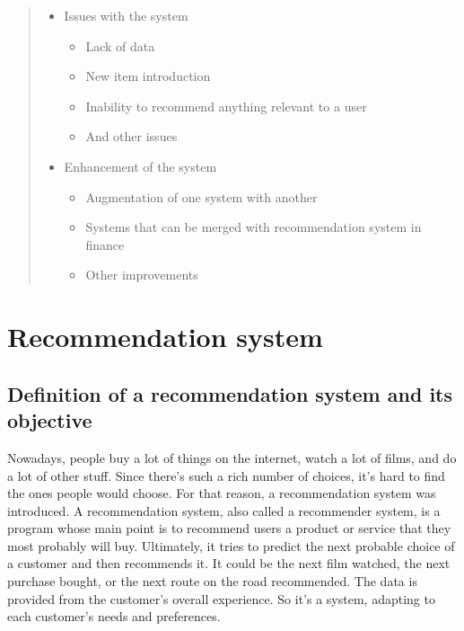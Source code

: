 \documentclass[10pt,twoside,english,a4paper]{article}
\begin{document}
\begin{abstract}
\begin{itemize}
    \item Issues with the system
    \begin{itemize}
        \item Lack of data
        \item New item introduction
        \item Inability to recommend anything relevant to a user
        \item And other issues
    \end{itemize}
    
    \item Enhancement of the system
    \begin{itemize}
        \item Augmentation of one system with another
        \item Systems that can be merged with recommendation system in finance
        \item Other improvements
    \end{itemize}\cite{arch_rec_sys}
\end{itemize}


\end{abstract}
\newpage
\tableofcontents
\newpage






\section{Recommendation system}

\subsection{Definition of a recommendation system and its objective}
Nowadays, people buy a lot of things on the internet, watch a lot of films, and do a lot of other stuff. Since there's such a rich number of choices, it's hard to find the ones people would choose. For that reason, a recommendation system was introduced. A recommendation system, also called a recommender system, is a program whose main point is to recommend users a product or service that they most probably will buy. Ultimately, it tries to predict the next probable choice of a customer and then recommends it. It could be the next film watched, the next purchase bought, or the next route on the road recommended. The data is provided from the customer's overall experience. So it's a system, adapting to each customer's needs and preferences.\cite{vars_rec_sys}
\end{document}
